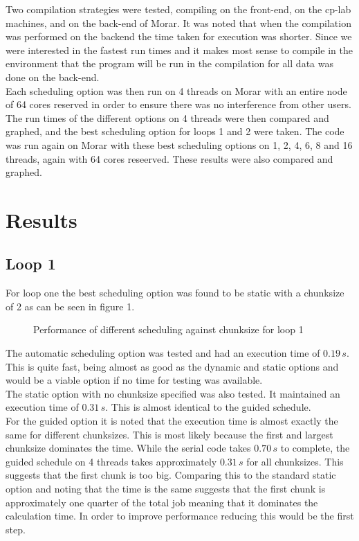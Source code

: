 \documentclass[12pt]{article}    %
\numberwithin{equation}{section}
\begin{document}
Two compilation strategies were tested, compiling on the front-end, on the cp-lab machines, and on the back-end of Morar.
It was noted that when the compilation was performed on the backend the time taken for execution was shorter.
Since we were interested in the fastest run times and it makes most sense to compile in the environment that the program will be run in the compilation for all data was done on the back-end.\\

Each scheduling option was then run on 4 threads on Morar with an entire node of 64 cores reserved in order to ensure there was no interference from other users.
The run times of the different options on 4 threads were then compared and graphed, and the best scheduling option for loops 1 and 2 were taken.
The code was run again on Morar with these best scheduling options on 1, 2, 4, 6, 8 and 16 threads, again with 64 cores reseerved.
These results were also compared and graphed.\\

\section{Results}
\subsection{Loop 1}
For loop one the best scheduling option was found to be static with a chunksize of 2 as can be seen in figure 1.
	\begin{figure}[ht]
		\centering
		
		\caption{Performance of different scheduling against chunksize for loop 1}
		\label{Figure 1:}
	\end{figure}

The automatic scheduling option was tested and had an execution time of $0.19\,s$.
This is quite fast, being almost as good as the dynamic and static options and would be a viable option if no time for testing was available.\\

The static option with no chunksize specified was also tested.
It maintained an execution time of $0.31\,s$.
This is almost identical to the guided schedule.\\

For the guided option it is noted that the execution time is almost exactly the same for different chunksizes.
This is most likely because the first and largest chunksize dominates the time.
While the serial code takes $0.70\,s$ to complete, the guided schedule on 4 threads takes approximately $0.31\,s$ for all chunksizes.
This suggests that the first chunk is too big.
Comparing this to the standard static option and noting that the time is the same suggests that the first chunk is approximately one quarter of the total job meaning that it dominates the calculation time.
In order to improve performance reducing this would be the first step.\\
\end{document}

